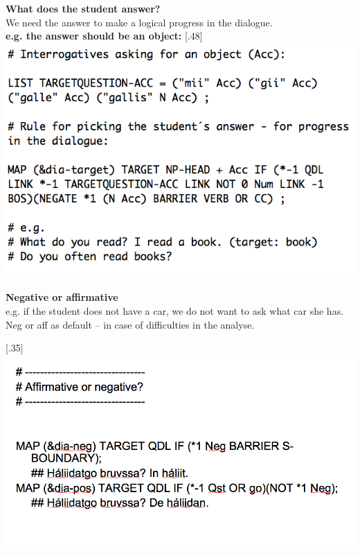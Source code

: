 \documentclass[landscape,norsk,11pt]{seminar}
\begin{document}
\begin{slide}
\newslide
\textbf{What does the student answer?}\\
We need the answer to make a logical progress in the dialogue. \\
\newslide
\textbf{e.g. the answer should be an object:}
\scalebox{.48}[.48]{\includegraphics{img/pickingObject.png}}


\newslide
\textbf{Negative or affirmative} \\
e.g. if the student does not have a car, we do not want to ask what car she has. \\
Neg or aff as default -- in case of difficulties in the analyse.

\newslide
\textbf{}
\scalebox{.35}[.35]{\includegraphics{img/aff_or_neg.png}}



\end{slide}
\end{document}
